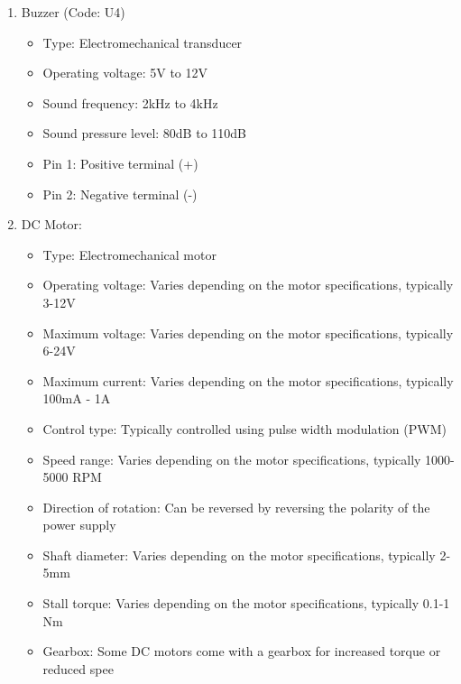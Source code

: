 \documentclass[11pt]{article}
\begin{document}
\begin{enumerate}
\begin{itemize}
	      \end{itemize}
	\item  Buzzer (Code: U4)
	      \begin{itemize}
		      \item Type: Electromechanical transducer
		      \item Operating voltage: 5V to 12V
		      \item Sound frequency: 2kHz to 4kHz
		      \item Sound pressure level: 80dB to 110dB
		      \item Pin 1: Positive terminal (+)
		      \item Pin 2: Negative terminal (-)
	      \end{itemize}
	\item DC Motor:
	      \begin{itemize}
		      \item Type: Electromechanical motor
		      \item Operating voltage: Varies depending on the motor specifications, typically 3-12V
		      \item Maximum voltage: Varies depending on the motor specifications, typically 6-24V
		      \item Maximum current: Varies depending on the motor specifications, typically 100mA - 1A
		      \item Control type: Typically controlled using pulse width modulation (PWM)
		      \item Speed range: Varies depending on the motor specifications, typically 1000-5000 RPM
		      \item Direction of rotation: Can be reversed by reversing the polarity of the power supply
		      \item Shaft diameter: Varies depending on the motor specifications, typically 2-5mm
		      \item Stall torque: Varies depending on the motor specifications, typically 0.1-1 Nm
		      \item Gearbox: Some DC motors come with a gearbox for increased torque or reduced spee
	      \end{itemize}
\end{enumerate}
\end{document}
